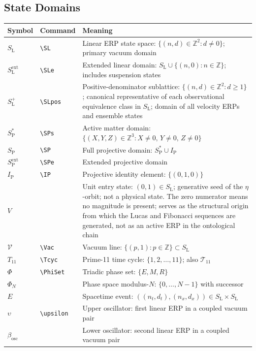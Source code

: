 \documentclass[11pt, letterpaper]{article}
\newcommand{\Z}{\mathbb{Z}}
\newcommand{\SL}{S_{\mathrm{L}}}
\newcommand{\SLe}{S_{\mathrm{L}}^{\mathrm{ext}}}
\newcommand{\SP}{S_{\mathrm{P}}}
\newcommand{\SPs}{S_{\mathrm{P}}^{*}}
\newcommand{\SPe}{S_{\mathrm{P}}^{\mathrm{ext}}}
\newcommand{\IP}{I_{\mathrm{P}}}
\newcommand{\Vac}{\mathcal{V}}
\newcommand{\SLpos}{S_{\mathrm{L}}^{+}}
\newcommand{\aop}{\eta}
\newcommand{\Tcyc}{T_{11}}
\newcommand{\PhiSet}{\Phi}
\theoremstyle{definition}
\theoremstyle{plain}
\begin{document}
\subsection{State Domains}

\begin{longtable}{L{2.0cm} L{2.6cm} L{8.5cm}}
\toprule
\textbf{Symbol} & \textbf{Command} & \textbf{Meaning} \\
\midrule\endhead\bottomrule\endfoot

$\SL$ & \verb|\SL| & Linear ERP state space:
  $\{(n,d)\in\Z^2:d\neq 0\}$; primary vacuum domain \\[3pt]
$\SLe$ & \verb|\SLe| & Extended linear domain:
  $\SL\cup\{(n,0):n\in\Z\}$; includes suspension states \\[3pt]
  $\SLpos$ & \verb|\SLpos| & Positive-denominator sublattice:
  $\{(n,d)\in\Z^2:d\geq 1\}$; canonical representative of each
  observational equivalence class in $\SL$; domain of all
  velocity ERPs and ensemble states \\[3pt]
$\SPs$ & \verb|\SPs| & Active matter domain:
  $\{(X,Y,Z)\in\Z^3:X\neq 0,\,Y\neq 0,\,Z\neq 0\}$ \\[3pt]
$\SP$ & \verb|\SP| & Full projective domain: $\SPs\cup\IP$ \\[3pt]
$\SPe$ & \verb|\SPe| & Extended projective domain \\[3pt]
$\IP$ & \verb|\IP| & Projective identity element: $\{(0,1,0)\}$ \\[3pt]
$V$ & & Unit entry state: $(0,1)\in\SL$; generative seed of the $\aop$-orbit;
  not a physical state.  The zero numerator means no magnitude is present;
  serves as the structural origin from which the Lucas and Fibonacci sequences
  are generated, not as an active ERP in the ontological chain \\[3pt]
$\Vac$ & \verb|\Vac| & Vacuum line: $\{(p,1):p\in\Z\}\subset\SL$ \\[3pt]
$\Tcyc$ & \verb|\Tcyc| & Prime-11 time cycle: $\{1,2,\dots,11\}$;
  also $\mathcal{T}_{11}$ \\[3pt]
$\PhiSet$ & \verb|\PhiSet| & Triadic phase set: $\{E,M,R\}$ \\[3pt]
$\Phi_N$ & & Phase space modulus-$N$:
  $\{0,\dots,N-1\}$ with successor \\[3pt]
$E$ & & Spacetime event:
  $((n_t,d_t),(n_x,d_x))\in\SL\times\SL$ \\[3pt]
$\upsilon$ & \verb|\upsilon| & Upper oscillator:
  first linear ERP in a coupled vacuum pair \\[3pt]
$\beta_{\mathrm{osc}}$ & & Lower oscillator:
  second linear ERP in a coupled vacuum pair \\[3pt]
\end{longtable}
\end{document}
